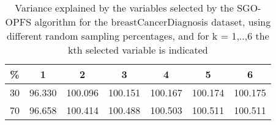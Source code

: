 \begin{table}
	\begin{center}
		\begin{tabular}{c c c c c c c}
			\% & 1 & 2 & 3 & 4 & 5 & 6 \\
			\hline
			30 & 96.330 & 100.096 & 100.151 & 100.167 & 100.174 & 100.175 \\
			70 & 96.658 & 100.414 & 100.488 & 100.503 & 100.511 & 100.511 \\
		\end{tabular}
	\end{center}
	\caption{Variance explained by the variables selected by the SGO-OPFS algorithm for the breastCancerDiagnosis dataset, using different random sampling percentages, and for k = 1,..,6 the kth selected variable is indicated}
\end{table}